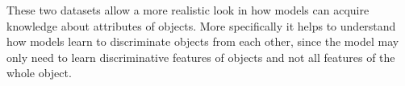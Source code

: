 These two datasets allow a more realistic look in how models can acquire knowledge about attributes of objects.
More specifically it helps to understand how models learn to discriminate objects from each other, since the model may only need to learn discriminative features of objects and not all features of the whole object.

